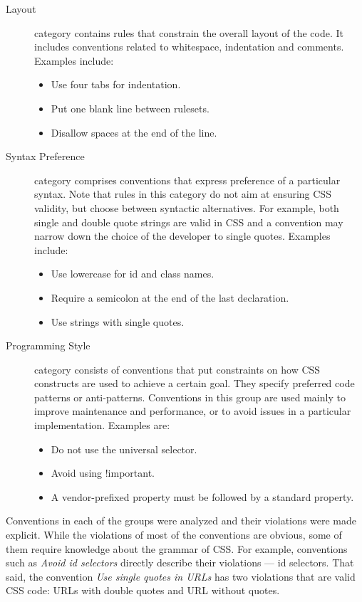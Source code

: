 \begin{description}
  \item[Layout] category contains rules that constrain the overall layout of the code. It includes conventions related to whitespace, indentation and comments. Examples include:
  \begin{itemize}
  \item Use four tabs for indentation.
  \item Put one blank line between rulesets.
  \item Disallow spaces at the end of the line.
  \end{itemize}
  \item[Syntax Preference] category comprises conventions that express preference of a particular syntax. Note that rules in this category do not aim at ensuring CSS validity, but choose between syntactic alternatives. For example, both single and double quote strings are valid in CSS and a convention may narrow down the choice of the developer to single quotes. Examples include:
  \begin{itemize}
  \item Use lowercase for id and class names.
  \item Require a semicolon at the end of the last declaration.
  \item Use strings with single quotes.
  \end{itemize}
  \item[Programming Style] category consists of conventions that put constraints on how CSS constructs are used to achieve a certain goal. They specify preferred code patterns or anti-patterns. Conventions in this group are used mainly to improve maintenance and performance, or to avoid issues in a particular implementation. Examples are:
  \begin{itemize}
  \item Do not use the universal selector.
  \item Avoid using !important.
  \item A vendor-prefixed property must be followed by a standard property.
  \end{itemize}
\end{description}

Conventions in each of the groups were analyzed and their violations were made
explicit. While the violations of most of the conventions are obvious, some of
them require knowledge about the grammar of CSS. For example, conventions such
as \textit{Avoid id selectors} directly describe their violations --- id
selectors. That said, the convention \textit{Use single quotes in URLs} has
two violations that are valid CSS code: URLs with double quotes and URL
without quotes.


